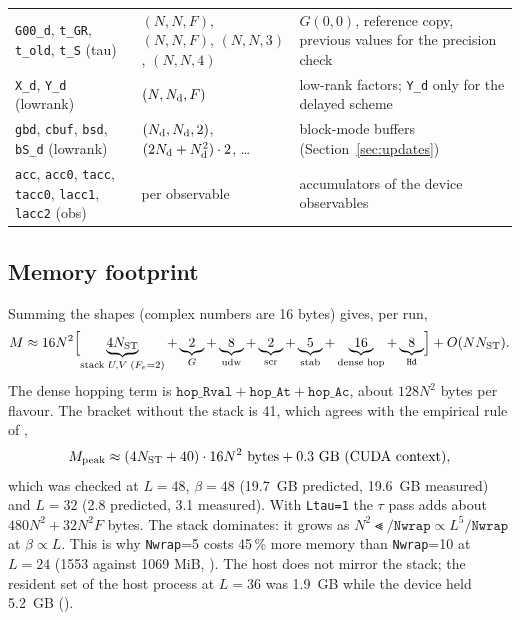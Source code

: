 \begin{small}
\begin{longtable}{@{}p{3.3cm}p{4.0cm}p{7.6cm}@{}}
\texttt{G00\_d}, \texttt{t\_GR}, \texttt{t\_old}, \texttt{t\_S} (tau) & $(N,N,F)$, $(N,N,F)$, $(N,N,3)$, $(N,N,4)$ & $G(0,0)$, reference copy, previous values for the precision check \\
\texttt{X\_d}, \texttt{Y\_d} (lowrank) & $(N,N_{\rm d},F)$ & low-rank factors; \texttt{Y\_d} only for the delayed scheme \\
\texttt{gbd}, \texttt{cbuf}, \texttt{bsd}, \texttt{bS\_d} (lowrank) & $(N_{\rm d},N_{\rm d},2)$, $(2N_{\rm d}+N_{\rm d}^2)\cdot 2$, \ldots & block-mode buffers (Section~\ref{sec:updates}) \\
\texttt{acc}, \texttt{acc0}, \texttt{tacc}, \texttt{tacc0}, \texttt{lacc1}, \texttt{lacc2} (obs) & per observable & accumulators of the device observables \\
\bottomrule
\end{longtable}
\end{small}

\subsection{Memory footprint}

Summing the shapes (complex numbers are 16 bytes) gives, per run,
\begin{equation}
M \approx 16N^2\Bigl[\underbrace{4N_{\rm ST}}_{\text{stack }U,V\;(F_e=2)} + \underbrace{2}_{G} + \underbrace{8}_{\rm udw} + \underbrace{2}_{\rm scr} + \underbrace{5}_{\rm stab} + \underbrace{16}_{\text{dense hop}} + \underbrace{8}_{\texttt{Hd}} \Bigr] + O(N N_{\rm ST}) .
\end{equation}
The dense hopping term is $\texttt{hop\_Rval}+\texttt{hop\_At}+\texttt{hop\_Ac}$, about $128N^2$ bytes per flavour. The bracket without the stack is 41, which agrees with the empirical rule of , %
\begin{equation}
M_{\rm peak} \approx (4N_{\rm ST}+40)\cdot16N^2\ \text{bytes} + 0.3~\text{GB (CUDA context)},
\end{equation}
which was checked at $L=48$, $\beta=48$ (19.7~GB predicted, 19.6~GB measured) and $L=32$ (2.8 predicted, 3.1 measured). %
With \texttt{Ltau=1} the $\tau$ pass adds about $480N^2+32N^2F$ bytes. The stack dominates: it grows as $N^2\Lt/\texttt{Nwrap}\propto L^5/\texttt{Nwrap}$ at $\beta\propto L$. This is why \texttt{Nwrap}=5 costs 45\,\% more memory than \texttt{Nwrap}=10 at $L=24$ (1553 against 1069 MiB, ). %
The host does not mirror the stack; the resident set of the host process at $L=36$ was 1.9~GB while the device held 5.2~GB (). %

